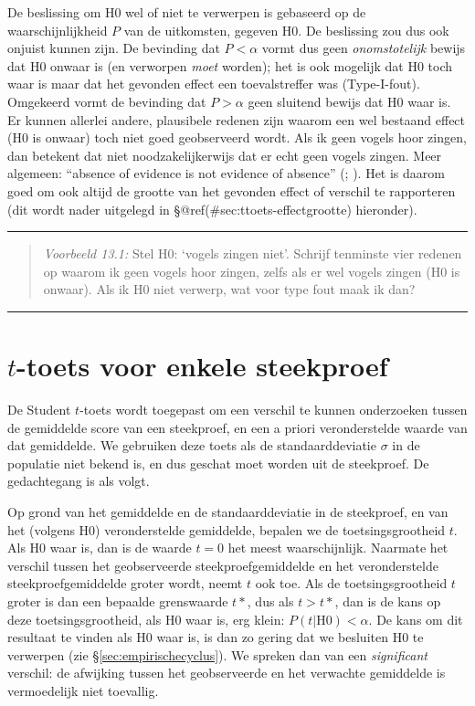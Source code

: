 \documentclass[
]{book}
\begin{document}
De beslissing om H0 wel of niet te verwerpen is gebaseerd op de
waarschijnlijkheid \(P\) van de uitkomsten, gegeven H0. De beslissing zou
dus ook onjuist kunnen zijn. De bevinding dat \(P < \alpha\) vormt dus
geen \emph{onomstotelijk} bewijs dat H0 onwaar is (en verworpen \emph{moet}
worden); het is ook mogelijk dat H0 toch waar is maar dat het gevonden
effect een toevalstreffer was (Type-I-fout). Omgekeerd vormt de
bevinding dat \(P > \alpha\) geen sluitend bewijs dat H0 waar is. Er
kunnen allerlei andere, plausibele redenen zijn waarom een wel bestaand
effect (H0 is onwaar) toch niet goed geobserveerd wordt. Als ik geen
vogels hoor zingen, dan betekent dat niet noodzakelijkerwijs dat er echt
geen vogels zingen. Meer algemeen: ``absence of evidence is not evidence
of absence'' (; ). Het is daarom goed om ook altijd de grootte van het
gevonden effect of verschil te rapporteren (dit wordt nader uitgelegd in
§@ref(\#sec:ttoets-effectgrootte) hieronder).

\begin{center}\rule{0.5\linewidth}{0.5pt}\end{center}

\begin{quote}
\emph{Voorbeeld 13.1:}
Stel H0: `vogels zingen niet'. Schrijf
tenminste vier redenen op waarom ik geen vogels hoor zingen, zelfs als
er wel vogels zingen (H0 is onwaar). Als ik H0 niet verwerp, wat voor
type fout maak ik dan?
\end{quote}

\begin{center}\rule{0.5\linewidth}{0.5pt}\end{center}

\hypertarget{sec:ttoets-onesample}{%
\section{\texorpdfstring{\(t\)-toets voor enkele steekproef}{t-toets voor enkele steekproef}}\label{sec:ttoets-onesample}}

De Student \(t\)-toets wordt toegepast om een verschil te kunnen onderzoeken tussen
de gemiddelde score van een steekproef, en een a priori veronderstelde
waarde van dat gemiddelde. We gebruiken deze toets als de
standaarddeviatie \(\sigma\) in de populatie niet bekend is, en dus
geschat moet worden uit de steekproef. De gedachtegang is als volgt.

Op grond van het gemiddelde en de standaarddeviatie in de steekproef, en
van het (volgens H0) veronderstelde gemiddelde, bepalen we de toetsingsgrootheid \(t\).
Als H0 waar is, dan is de waarde \(t=0\) het meest waarschijnlijk.
Naarmate het verschil tussen het geobserveerde steekproefgemiddelde en
het veronderstelde steekproefgemiddelde groter wordt, neemt \(t\) ook toe.
Als de toetsingsgrootheid \(t\) groter is dan een bepaalde grenswaarde
\(t*\), dus als \(t>t*\), dan is de kans op deze toetsingsgrootheid, als H0
waar is, erg klein: \(P(t|\textrm{H0}) < \alpha\). De kans om dit
resultaat te vinden als H0 waar is, is dan zo gering dat we besluiten H0
te verwerpen (zie
§\ref{sec:empirischecyclus}). We spreken dan van een \emph{significant}
verschil: de afwijking tussen het geobserveerde en het verwachte
gemiddelde is vermoedelijk niet toevallig.
\end{document}
